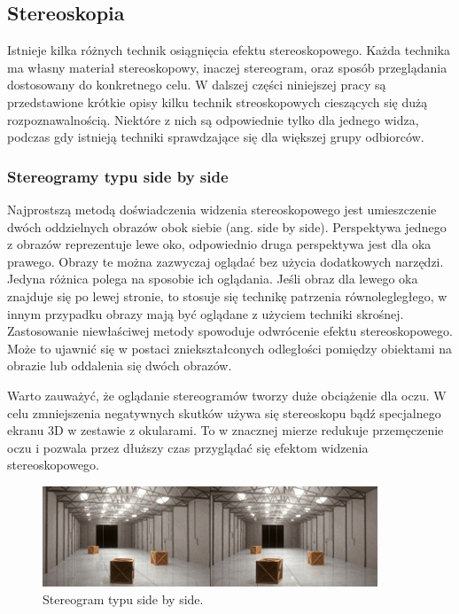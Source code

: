 \subsection{Stereoskopia}
Istnieje kilka różnych technik osiągnięcia efektu stereoskopowego. Każda technika ma własny materiał stereoskopowy, inaczej stereogram, oraz sposób przeglądania dostosowany do konkretnego celu. W dalszej części niniejszej pracy są przedstawione krótkie opisy kilku technik streoskopowych cieszących się dużą rozpoznawalnością. Niektóre z nich są odpowiednie tylko dla jednego widza, podczas gdy istnieją techniki sprawdzające się dla większej grupy odbiorców.

\subsubsection{Stereogramy typu side by side}
Najprostszą metodą doświadczenia widzenia stereoskopowego jest umieszczenie dwóch oddzielnych obrazów obok siebie (ang. side by side). Perspektywa jednego z obrazów reprezentuje lewe oko, odpowiednio druga perspektywa jest dla oka prawego. Obrazy te można zazwyczaj oglądać bez użycia dodatkowych narzędzi. Jedyna różnica polega na sposobie ich oglądania. Jeśli obraz dla lewego oka znajduje się po lewej stronie, to stosuje się technikę patrzenia równolegległego, w innym przypadku obrazy mają być oglądane z użyciem techniki skrośnej. Zastosowanie niewłaściwej metody spowoduje odwrócenie efektu stereoskopowego. Może to ujawnić się w postaci zniekształconych odległości pomiędzy obiektami na obrazie lub oddalenia się dwóch obrazów.

Warto zauważyć, że oglądanie stereogramów tworzy duże obciążenie dla oczu. W celu zmniejszenia negatywnych skutków używa się stereoskopu bądź specjalnego ekranu 3D w zestawie z okularami. To w znacznej mierze redukuje przemęczenie oczu i pozwala przez dłuższy czas przyglądać się efektom widzenia stereoskopowego.
\begin{figure}[H]
		\centering
 		\includegraphics[width=10cm]{sbs.jpg}
    	\caption{Stereogram typu side by side\cite{sidebyside}.}
 		\label{rys1}
\end{figure}

